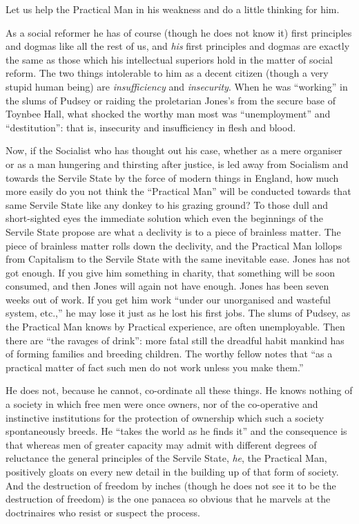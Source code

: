 \documentclass{book}
\begin{document}
Let us help the Practical Man in his weakness and do a little thinking for him.

As a social reformer he has of course (though he does not know it) first principles and dogmas like all the rest of us, and \emph{his} first principles and dogmas are exactly the same as those which his intellectual superiors hold in the matter of social reform. The two things intolerable to him as a decent citizen (though a very stupid human being) are \emph{insufficiency} and \emph{insecurity}. When he was “working” in the slums of Pudsey or raiding the proletarian Jones’s from the secure base of Toynbee Hall, what shocked the worthy man most was “unemployment” and “destitution”: that is, insecurity and insufficiency in flesh and blood.

Now, if the Socialist who has thought out his case, whether as a mere organiser or as a man hungering and thirsting after justice, is led away from Socialism and towards the Servile State by the force of modern things in England, how much more easily do you not think the “Practical Man” will be conducted towards that same Servile State like any donkey to his grazing ground? To those dull and short-sighted eyes the immediate solution which even the beginnings of the Servile State propose are what a declivity is to a piece of brainless matter. The piece of brainless matter rolls down the declivity, and the Practical Man lollops from Capitalism to the Servile State with the same inevitable ease. Jones has not got enough. If you give him something in charity, that something will be soon consumed, and then Jones will again not have enough. Jones has been seven weeks out of work. If you get him work “under our unorganised and wasteful system, etc.,” he may lose it just as he lost his first jobs. The slums of Pudsey, as the Practical Man knows by Practical experience, are often unemployable. Then there are “the ravages of drink”: more fatal still the dreadful habit mankind has of forming families and breeding children. The worthy fellow notes that “as a practical matter of fact such men do not work unless you make them.”

He does not, because he cannot, co-ordinate all these things. He knows nothing of a society in which free men were once owners, nor of the co-operative and instinctive institutions for the protection of ownership which such a society spontaneously breeds. He “takes the world as he finds it” and the consequence is that whereas men of greater capacity may admit with different degrees of reluctance the general principles of the Servile State, \emph{he}, the Practical Man, positively gloats on every new detail in the building up of that form of society. And the destruction of freedom by inches (though he does not see it to be the destruction of freedom) is the one panacea so obvious that he marvels at the doctrinaires who resist or suspect the process.
\end{document}
